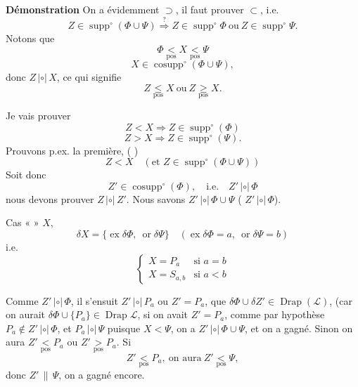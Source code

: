 \documentclass[11pt,a4paper]{article}
\begin{document}

\textbf{Démonstration} On a évidemment $\supset$, il faut prouver $\subset$, i.e.
\[ Z\in\operatorname{supp}^\circ(\Phi\cup\Psi) \overset{?}{\Longrightarrow} Z\in\operatorname{supp}^\circ\Phi \ \text{ou}\ Z\in\operatorname{supp}^\circ\Psi . \]
\struck{\ill{}} Notons que
\[ \Phi \underset{\mathrm{pos}}{<} X \underset{\mathrm{pos}}{<} \Psi \]
\[ X\in\operatorname{cosupp}^\circ(\Phi\cup\Psi), \]
donc $Z\,|{\circ}|\,X$, ce qui signifie \ill{}
\[ Z \underset{\mathrm{pos}}{\leq} X \ \text{ou}\ Z \underset{\mathrm{pos}}{\geq} X . \]

Je vais prouver
\[ Z<X \Longrightarrow Z\in\operatorname{supp}^\circ(\Phi) \]
\[ Z>X \Longrightarrow Z\in\operatorname{supp}^\circ(\Psi) . \]
 Prouvons p.ex. la première, ( \ill{})
\[ Z<X \quad (\text{et } Z\in\operatorname{supp}^\circ(\Phi\cup\Psi)) \]
Soit donc
\[ Z'\in\operatorname{cosupp}^\circ(\Phi), \quad\text{i.e.}\quad Z'\,|{\circ}|\,\Phi \]
nous \struck{\ill{}} devons prouver $Z\,|{\circ}|\,Z'$. Nous  savons \ill{}   $Z'\,|{\circ}|\,\Phi\cup\Psi$ ( \ill{}  $Z'\,|{\circ}|\,\Phi$).

 Cas  «  » $X$,  \ill{}
\[ \delta X = \{\operatorname{ex}\delta\Phi,\ \operatorname{or}\delta\Psi\} \quad (\operatorname{ex}\delta\Phi=a,\ \operatorname{or}\delta\Psi=b) \]
i.e.
\[ \begin{cases} X=P_a & \text{si } a=b \\ X=S_{a,b} & \text{si } a<b \end{cases} \]

\struck{\ill{}} Comme $Z'\,|{\circ}|\,\Phi$, il s'ensuit \struck{\ill{}} $Z'\,|{\circ}|\,P_a$ ou $Z'=P_a$,  que $\delta\Phi\cup\delta Z'\in\operatorname{Drap}(\mathcal{L})$,   (car on aurait $\delta\Phi\cup\{P_a\}\in\operatorname{Drap}\mathcal{L}$, \struck{\ill{}} si on avait $Z'=P_a$, comme par hypothèse $P_a\notin Z'\,|{\circ}|\,\Phi$, et $P_a\,|{\circ}|\,\Psi$ puisque $X<\Psi$, on a $Z'\,|{\circ}|\,\Phi\cup\Psi$, et on a gagné. Sinon on aura $Z' \underset{\mathrm{pos}}{<} P_a$ ou $Z' \underset{\mathrm{pos}}{>} P_a$. Si
\[ Z' \underset{\mathrm{pos}}{<} P_a, \ \text{on aura}\ Z' \underset{\mathrm{pos}}{<} \Psi, \]
donc $Z'\,\|\,\Psi$, on a gagné encore.
\end{document}
